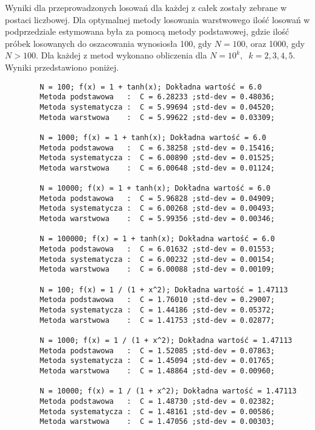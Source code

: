 \documentclass[a4paper, 12pt]{article}
\begin{document}
    Wyniki dla przeprowadzonych losowań dla każdej z całek zostały zebrane w postaci liczbowej.
    Dla optymalnej metody losowania warstwowego ilość losowań w podprzedziale estymowana była za pomocą metody podstawowej, gdzie ilość próbek losowanych do oszacowania wynosiosła 100, gdy $N = 100$, oraz 1000, gdy $N > 100$.
    Dla każdej z metod wykonano obliczenia dla $N = 10^k, \; \; k = 2,3,4,5$.
    Wyniki przedstawiono poniżej.

\begin{verbatim}
        N = 100; f(x) = 1 + tanh(x); Dokładna wartość = 6.0
        Metoda podstawowa   :  C = 6.28233 ;std-dev = 0.48036;
        Metoda systematycza :  C = 5.99694 ;std-dev = 0.04520;
        Metoda warstwowa    :  C = 5.99622 ;std-dev = 0.03309;
        
        N = 1000; f(x) = 1 + tanh(x); Dokładna wartość = 6.0
        Metoda podstawowa   :  C = 6.38258 ;std-dev = 0.15416;
        Metoda systematycza :  C = 6.00890 ;std-dev = 0.01525;
        Metoda warstwowa    :  C = 6.00648 ;std-dev = 0.01124;
        
        N = 10000; f(x) = 1 + tanh(x); Dokładna wartość = 6.0
        Metoda podstawowa   :  C = 5.96828 ;std-dev = 0.04909;
        Metoda systematycza :  C = 6.00268 ;std-dev = 0.00493;
        Metoda warstwowa    :  C = 5.99356 ;std-dev = 0.00346;
        
        N = 100000; f(x) = 1 + tanh(x); Dokładna wartość = 6.0
        Metoda podstawowa   :  C = 6.01632 ;std-dev = 0.01553;
        Metoda systematycza :  C = 6.00232 ;std-dev = 0.00154;
        Metoda warstwowa    :  C = 6.00088 ;std-dev = 0.00109;
        
        N = 100; f(x) = 1 / (1 + x^2); Dokładna wartość = 1.47113
        Metoda podstawowa   :  C = 1.76010 ;std-dev = 0.29007;
        Metoda systematycza :  C = 1.44186 ;std-dev = 0.05372;
        Metoda warstwowa    :  C = 1.41753 ;std-dev = 0.02877;
        
        N = 1000; f(x) = 1 / (1 + x^2); Dokładna wartość = 1.47113
        Metoda podstawowa   :  C = 1.52085 ;std-dev = 0.07863;
        Metoda systematycza :  C = 1.45094 ;std-dev = 0.01765;
        Metoda warstwowa    :  C = 1.48864 ;std-dev = 0.00960;
        
        N = 10000; f(x) = 1 / (1 + x^2); Dokładna wartość = 1.47113
        Metoda podstawowa   :  C = 1.48730 ;std-dev = 0.02382;
        Metoda systematycza :  C = 1.48161 ;std-dev = 0.00586;
        Metoda warstwowa    :  C = 1.47056 ;std-dev = 0.00303;
        

\end{verbatim}
\end{document}
